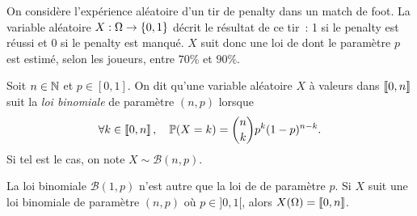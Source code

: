 \documentclass{magnolia}
\begin{document}
\begin{exempleUnique}
\exemple On considère l'expérience aléatoire d'un tir de penalty dans un match de foot. 
  La variable aléatoire $X:\Omega\to\left\{0,1\right\}$ décrit le résultat de ce tir~: 1 si le
  penalty est réussi et 0 si le penalty est manqué. $X$ suit donc une loi de
   dont le paramètre $p$ est estimé, selon les joueurs, entre $70\%$ et $90\%$.
\end{exempleUnique}

\begin{definition}[nom={Loi binomiale}]
Soit $n\in\mathbb{N}$ et $p\in[0,1]$. On dit qu'une variable aléatoire $X$ à valeurs dans $\left\llbracket 0,n\right\rrbracket$
suit la \emph{loi binomiale} de paramètre $(n,p)$ lorsque
\[\forall k\in\left\llbracket 0,n\right\rrbracket,\quad \mathbb{P}(X=k)=\binom{n}{k}p^k(1-p)^{n-k}.\]
Si tel est le cas, on note $X\sim\mathcal{B}(n,p)$. 
\end{definition}

\begin{remarques}
\remarque La loi binomiale $\mathcal{B}(1,p)$ n'est autre
  que la loi de  de paramètre $p$.
\remarque Si $X$ suit une loi binomiale de paramètre $(n,p)$ où $p\in]0,1[$, alors $X(\Omega)=\left\llbracket 0,n\right\rrbracket$.
\end{remarques}



\begin{center}


\end{center}
\end{document}
